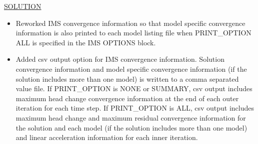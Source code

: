 	\underline{SOLUTION}
	\begin{itemize}
		\item Reworked IMS convergence information so that model specific convergence information is also printed to each model listing file when PRINT\_OPTION ALL is specified in the IMS OPTIONS block.
		\item Added csv output option for IMS convergence information. Solution convergence information and model specific convergence information (if the solution includes more than one model) is written to a comma separated value file. If PRINT\_OPTION is NONE or SUMMARY, csv output includes maximum head change convergence information at the end of each outer iteration for each time step. If PRINT\_OPTION is ALL, csv output includes maximum head change and maximum residual convergence information for the solution and each model (if the solution includes more than one model) and linear acceleration information for each inner iteration. 
	\end{itemize}
	
